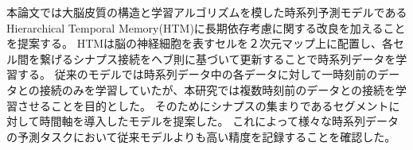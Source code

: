 \abstract
本論文では大脳皮質の構造と学習アルゴリズムを模した時系列予測モデルであるHierarchical Temporal Memory(HTM)に長期依存考慮に関する改良を加えることを提案する。
HTMは脳の神経細胞を表すセルを２次元マップ上に配置し、各セル間を繋げるシナプス接続をヘブ則に基づいて更新することで時系列データを学習する。
従来のモデルでは時系列データ中の各データに対して一時刻前のデータとの接続のみを学習していたが、本研究では複数時刻前のデータとの接続を学習させることを目的とした。
そのためにシナプスの集まりであるセグメントに対して時間軸を導入したモデルを提案した。
これによって様々な時系列データの予測タスクにおいて従来モデルよりも高い精度を記録することを確認した。
